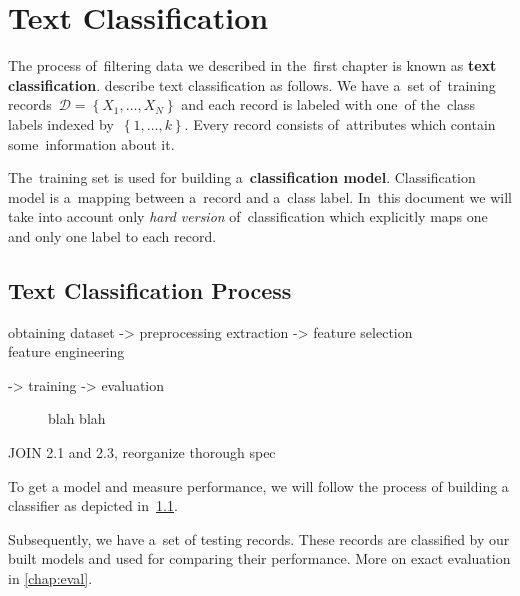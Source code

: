\chapter{Text Classification}


The process of~filtering data we described in the~first chapter is known as {\bf text classification}.
\citet{AggZhai12} describe text classification as follows.
We have a~set of~training records~$\mathcal{D} = \left\{X_1, \ldots, X_N\right\}$ and each record is labeled with one~of the~class labels indexed by~$\left\{1,\ldots, k\right\}$.
Every record consists of~attributes which contain some~information about it.

The~training set is used for building a~{\bf classification model}. Classification model is a~mapping between a~record and a~class label.
In~this document we will take into account only \emph{hard version} of~classification which explicitly maps one and only one label to each record.  

\section{Text Classification Process}

\begin{code}
obtaining dataset
-> preprocessing {extraction} -> feature selection
 ^^^^^^^^^^^^^^^^^^^^^^^^^^^^^^^^^^^^^^^^^^^^^^^^^^^^^^
    		feature engineering

-> training -> evaluation
\end{code}
\begin{figure}
	blah blah
\label{cls_process}
\end{figure}

JOIN 2.1 and 2.3, reorganize thorough spec

To get a model and measure performance, we will follow the process of building a classifier as depicted in~\ref{cls_process}.

Subsequently, we have a~set of testing records.
These records are classified by our built models and used for comparing their performance.
More on exact evaluation in \autoref{chap:eval}.

